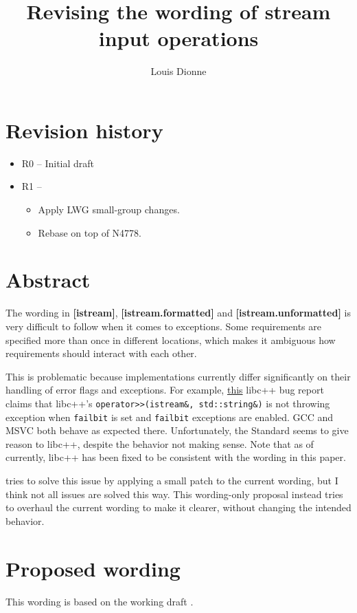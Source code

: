 \documentclass{wg21}
\title{Revising the wording of stream input operations}
\author{Louis Dionne}{ldionne@apple.com}
\newcommand{\cc}[1]{\texttt{#1}}
\begin{document}
\maketitle

\section{Revision history}
\begin{itemize}
  \item R0 -- Initial draft
  \item R1 -- \begin{itemize}
              \item Apply LWG small-group changes.
              \item Rebase on top of N4778.
              \end{itemize}
\end{itemize}

\section{Abstract}
The wording in \textbf{[istream]}, \textbf{[istream.formatted]} and
\textbf{[istream.unformatted]} is very difficult to follow when it comes
to exceptions. Some requirements are specified more than once in different
locations, which makes it ambiguous how requirements should interact with
each other.

This is problematic because implementations currently differ significantly
on their handling of error flags and exceptions. For example,
\href{https://bugs.llvm.org/show_bug.cgi?id=21586}{this} libc++ bug
report claims that libc++'s \break \cc{operator>>(istream&, std::string&)} is
not throwing exception when \cc{failbit} is set and \cc{failbit} exceptions
are enabled. GCC and MSVC both behave as expected there. Unfortunately, the
Standard seems to give reason to libc++, despite the behavior not making sense.
Note that as of currently, libc++ has been fixed to be consistent with the
wording in this paper.

\cite{LWG2349} tries to solve this issue by applying a small patch to the current
wording, but I think not all issues are solved this way. This wording-only
proposal instead tries to overhaul the current wording to make it clearer,
without changing the intended behavior.


\section{Proposed wording}
This wording is based on the working draft \cite{N4778}.
\end{document}
